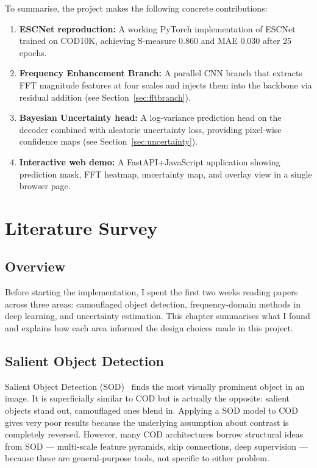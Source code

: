 \documentclass[12pt,a4paper]{report}
\begin{document}
To summarise, the project makes the following concrete contributions:

\begin{enumerate}
  \item \textbf{ESCNet reproduction:} A working PyTorch implementation of ESCNet trained on COD10K, achieving S-measure 0.860 and MAE 0.030 after 25 epochs.
  \item \textbf{Frequency Enhancement Branch:} A parallel CNN branch that extracts FFT magnitude features at four scales and injects them into the backbone via residual addition (see Section~\ref{sec:fftbranch}).
  \item \textbf{Bayesian Uncertainty head:} A log-variance prediction head on the decoder combined with aleatoric uncertainty loss, providing pixel-wise confidence maps (see Section~\ref{sec:uncertainty}).
  \item \textbf{Interactive web demo:} A FastAPI+JavaScript application showing prediction mask, FFT heatmap, uncertainty map, and overlay view in a single browser page.
\end{enumerate}



\chapter{Literature Survey}\label{chap:litsurvey}

\section{Overview}

Before starting the implementation, I spent the first two weeks reading papers across three areas: camouflaged object detection, frequency-domain methods in deep learning, and uncertainty estimation. This chapter summarises what I found and explains how each area informed the design choices made in this project.

\section{Salient Object Detection}

Salient Object Detection (SOD)~\cite{liu2019poolnet} finds the most visually prominent object in an image. It is superficially similar to COD but is actually the opposite: salient objects stand out, camouflaged ones blend in. Applying a SOD model to COD gives very poor results because the underlying assumption about contrast is completely reversed. However, many COD architectures borrow structural ideas from SOD — multi-scale feature pyramids, skip connections, deep supervision — because these are general-purpose tools, not specific to either problem.
\end{document}
